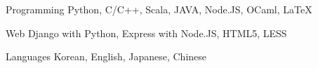 
\begin{cvskills}

  \cvskill
  {Programming} %
  {Python, C/C++, Scala, JAVA, Node.JS, OCaml, LaTeX} %

  \cvskill
  {Web} %
  {Django with Python, Express with Node.JS, HTML5, LESS} %

  \cvskill
  {Languages} %
  {Korean, English, Japanese, Chinese} %

\end{cvskills}
